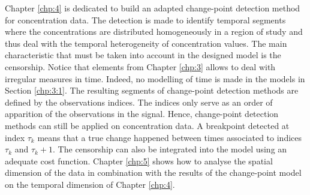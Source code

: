 Chapter \ref{chp:4} is dedicated to build an adapted change-point detection method for concentration data. The detection is made to identify temporal segments where the concentrations are distributed homogeneously in a region of study and thus deal with the temporal heterogeneity of concentration values. The main characteristic that must be taken into account in the designed model is the censorship. Notice that elements from Chapter \ref{chp:3} allows to deal with irregular measures in time. Indeed, no modelling of time is made in the models in Section \ref{chp:3:1}. The resulting segments of change-point detection methods are defined by the observations indices. The indices only serve as an order of apparition of the observations in the signal. Hence, change-point detection methods can still be applied on concentration data. A breakpoint detected at index $\tau_k$ means that a true change happened between times associated to indices $\tau_{k}$ and $\tau_{k}+1$. The censorship can also be integrated into the model using an adequate cost function. Chapter \ref{chp:5} shows how to analyse the spatial dimension of the data in combination with the results of the change-point model on the temporal dimension of Chapter \ref{chp:4}.        
